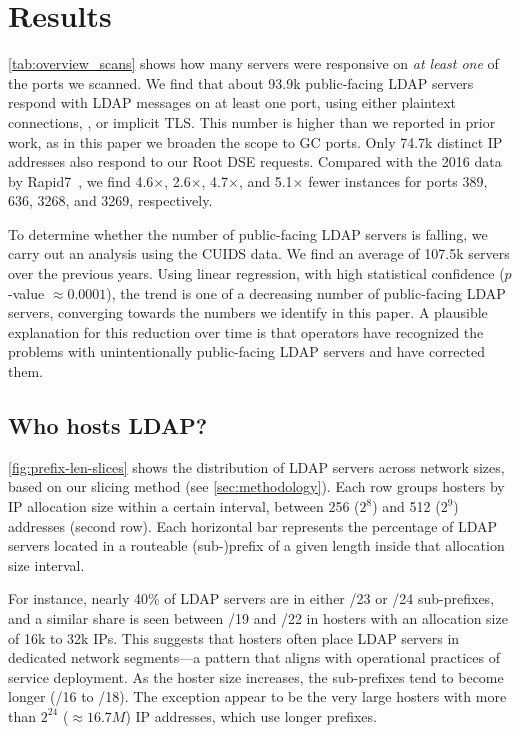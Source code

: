 \section{Results}
\label{sec:results}

\cref{tab:overview_scans} shows how many servers were responsive on \textit{at least one} of the ports we scanned. We find that about 93.9k public-facing \gls{LDAP} servers respond with \gls{LDAP} messages on at least one port, using either plaintext connections, \starttls, or implicit TLS. This number is higher than we reported in prior work, as in this paper we broaden the scope to \gls{GC} ports. Only 74.7k distinct IP addresses also respond to our Root DSE requests. Compared with the 2016 data by Rapid7~\cite{project_sonar_rapid7}, we find 4.6$\times$, 2.6$\times$, 4.7$\times$, and 5.1$\times$ fewer instances for ports 389, 636, 3268, and 3269, respectively.

To determine whether the number of public-facing \gls{LDAP} servers is falling, we carry out an analysis using the \gls{CUIDS} data. We find an average of 107.5k servers over the previous years. Using linear regression, with high statistical confidence ($p$-value $\approx 0.0001$), the trend is one of a decreasing number of public-facing \gls{LDAP} servers, converging towards the numbers we identify in this paper.
A plausible explanation for this reduction over time is that operators have recognized the problems with unintentionally public-facing \gls{LDAP} servers and have corrected them.

\subsection{Who hosts LDAP?}
\cref{fig:prefix-len-slices} shows the distribution of \gls{LDAP} servers across network sizes, based on our slicing method (see \cref{sec:methodology}). Each row groups hosters by IP allocation size within a certain interval, \eg between 256 ($2^8$) and 512 ($2^9$) addresses (second row). Each horizontal bar represents the percentage of \gls{LDAP} servers located in a routeable (sub-)prefix of a given length inside that allocation size interval.

For instance, nearly 40\% of \gls{LDAP} servers are in either /23 or /24 sub-prefixes, and a similar share is seen between /19 and /22 in hosters with an allocation size of 16k to 32k IPs. This suggests that hosters often place \gls{LDAP} servers in dedicated network segments---a pattern that aligns with operational practices of service deployment. As the hoster size increases, the sub-prefixes tend to become longer (/16 to /18). The exception appear to be the very large hosters with more than $2^{24}$ ($\approx 16.7M$) IP addresses, which use longer prefixes.

